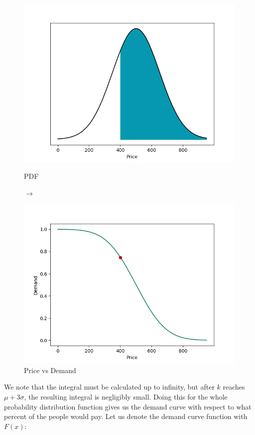 \documentclass[11pt, a4paper]{article}
\theoremstyle{definition}
\begin{document}
			\begin{figure}[H]
				\begin{minipage}{0.48\textwidth}
					\centering
					\includegraphics[width=\linewidth]{ND_integral}
					\caption{PDF}\label{Fig:Data1}
				\end{minipage}$\longrightarrow$
				\begin{minipage}{0.48\textwidth}
					\centering
					\includegraphics[width=\linewidth]{Sample_point}
					\caption{Price vs Demand}\label{Fig:Data2}
				\end{minipage}
			\end{figure}\par\noindent
			We note that the integral must be calculated up to infinity, but after $k$ reaches $\mu+3\sigma$, the resulting integral is negligibly small. Doing this for the whole probability distribution function gives us the demand curve with respect to what percent of the people would pay. Let us denote the demand curve function with $F(x)$:
\end{document}
